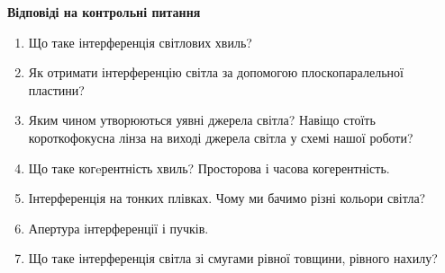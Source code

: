 \begin{center}
    \Large{\textbf{Відповіді на контрольні питання}}    
\end{center}

\vspace{1mm}

\begin{enumerate}
    \item Що таке інтерференція світлових хвиль?
    \bigbreak


    \item Як отримати інтерференцію світла за допомогою плоскопаралельної пластини?
    \bigbreak


    \item Яким чином утворюються уявні джерела світла? Навіщо стоїть 
    короткофокусна лінза на виході джерела світла у схемі нашої роботи?
    \bigbreak


    \item Що таке когeрентність хвиль? Просторова і часова когерентність.
    \bigbreak

    
    \item Інтерференція на тонких плівках. Чому ми бачимо різні кольори світла?
    \bigbreak

    
    \item Апертура інтерференції і пучків.
    \bigbreak


    \item Що таке інтерференція світла зі смугами рівної товщини, рівного нахилу?
    \bigbreak


\end{enumerate}